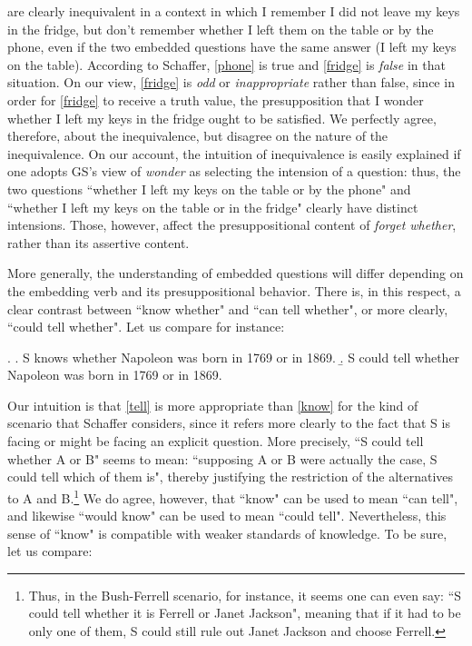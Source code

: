 \noindent are clearly inequivalent in a context in which I
remember I did not leave my keys in the fridge, but don't remember
whether I left them on the table or by the phone, even if the two
embedded questions have the same answer (I left my keys on the
table). According to Schaffer, \ref{phone} is true and
\ref{fridge} is \emph{false} in that situation. On our view,
\ref{fridge} is \emph{odd} or \emph{inappropriate} rather than
false, since in order for \ref{fridge} to receive a truth value,
the presupposition that I wonder whether I left my keys in the
fridge ought to be satisfied. We perfectly agree, therefore, about
the inequivalence, but disagree on the nature of the
inequivalence. On our account, the intuition of inequivalence is
easily explained if one adopts GS's view of \emph{wonder} as
selecting the intension of a question: thus, the two questions
``whether I left my keys on the table or by the phone" and
``whether I left my keys on the table or in the fridge" clearly
have distinct intensions. Those, however, affect the
presuppositional content of \emph{forget whether}, rather than its
assertive content.

More generally, the understanding of embedded questions will
differ depending on the embedding verb and its presuppositional
behavior. There is, in this respect, a clear contrast between
``know whether" and ``can tell whether", or more clearly, ``could
tell whether". Let us compare for instance:

\ex. \a.\label{know} S knows whether Napoleon was born in 1769 or
in 1869. \b.\label{tell} S could tell whether Napoleon was born in
1769 or in 1869.

Our intuition is that \ref{tell} is more appropriate than
\ref{know} for the kind of scenario that Schaffer considers, since
it refers more clearly to the fact that S is facing or might be
facing an explicit question. More precisely, ``S could tell
whether A or B" seems to mean: ``supposing A or B were actually
the case, S could tell which of them is", thereby justifying the
restriction of the alternatives to A and B.\footnote{Thus, in the
Bush-Ferrell scenario, for instance, it seems one can even say:
``S could tell whether it is Ferrell or Janet Jackson", meaning
that if it had to be only one of them, S could still rule out
Janet Jackson and choose Ferrell.} We do agree, however, that
``know" can be used to mean ``can tell", and likewise ``would
know" can be used to mean ``could tell". Nevertheless, this sense
of ``know" is compatible with weaker standards of knowledge. To be
sure, let us compare:


